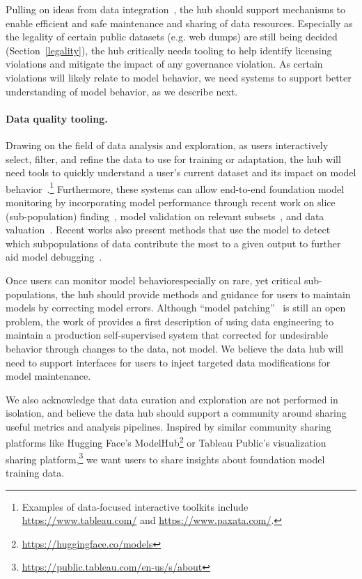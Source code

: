 Pulling on ideas from data integration~\citep{rekatsinas2017slimfast}, the hub should support mechanisms to enable efficient and safe maintenance and sharing of data resources. Especially as the legality of certain public datasets (e.g. web dumps) are still being decided (Section~\ref{legality}), the hub critically needs tooling to help identify licensing violations and mitigate the impact of any governance violation. As certain violations will likely relate to model behavior, we need systems to support better understanding of model behavior, as we describe next.

\paragraph{Data quality tooling.} Drawing on the field of data analysis and exploration, as users interactively select, filter, and refine the data to use for training or adaptation, the hub will need tools to quickly understand a user's current dataset and its impact on model behavior~\citep{hohman2020understanding}.\footnote{Examples of data-focused interactive toolkits include \url{https://www.tableau.com/} and \url{https://www.paxata.com/}.} Furthermore, these systems can allow end-to-end foundation model monitoring by incorporating model performance through recent work on slice (sub-population) finding~\citep{chung2019slice}, model validation on relevant subsets~\citep{goel2021robustnessgym, ribeiro2020beyond}, and data valuation~\citep{ghorbani2019data}. Recent works also present methods that use the model to detect which subpopulations of data contribute the most to a given output to further aid model debugging~\citep{keskar2019ctrl}.

Once users can monitor model behavior\textemdash especially on rare, yet critical sub-populations\textemdash, the hub should provide methods and guidance for users to maintain models by correcting model errors. Although ``model patching''~\citep{goel2020model} is still an open problem, the work of \citep{orr2020bootleg} provides a first description of using data engineering to maintain a production self-supervised system that corrected for undesirable behavior through changes to the data, not model. We believe the data hub will need to support interfaces for users to inject targeted data modifications for model maintenance.

We also acknowledge that data curation and exploration are not performed in isolation, and believe the data hub should support a community around sharing useful metrics and analysis pipelines. Inspired by similar community sharing platforms like Hugging Face’s ModelHub\footnote{\url{https://huggingface.co/models}} or Tableau Public’s visualization sharing platform,\footnote{\url{https://public.tableau.com/en-us/s/about}} we want users to share insights about foundation model training data.

